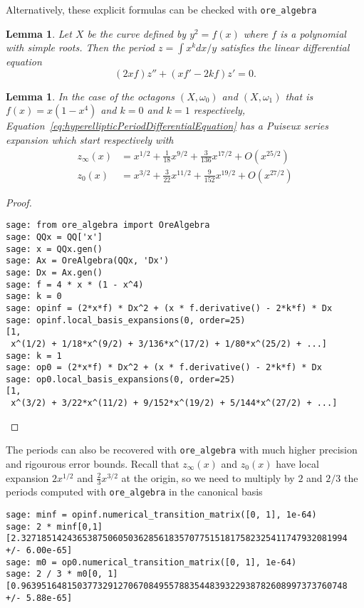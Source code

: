 \documentclass[a4paper,12pt]{article}
\newtheorem{lemma}[definition]{Lemma}
\begin{document}
Alternatively, these explicit formulas can be checked with \texttt{ore\_algebra}
\begin{lemma}
Let $X$ be the curve defined by $y^2 = f(x)$ where $f$ is a polynomial with simple roots.
Then the period $z = \int x^k dx / y$ satisfies the linear differential equation
\begin{equation}
\label{eq:hyperellipticPeriodDifferentialEquation}
(2xf) z'' + (x f' - 2kf) z' = 0.
\end{equation}
\end{lemma}

\begin{lemma}
In the case of the octagons $(X, \omega_0)$ and $(X, \omega_1)$ that is $f(x) = x (1-x^4)$
and $k=0$ and $k=1$ respectively, Equation~\eqref{eq:hyperellipticPeriodDifferentialEquation}
has a Puiseux series expansion which start respectively with
\begin{align*}
 z_\infty(x) &= x^{1/2} + \frac{1}{18} x^{9/2} + \frac{3}{136} x^{17/2} + O(x^{25/2}) \\
 z_0(x) &= x^{3/2} + \frac{3}{22} x^{11/2} + \frac{9}{152} x^{19/2} + O(x^{27/2})
\end{align*}
\end{lemma}
\begin{proof}
\begin{verbatim}
sage: from ore_algebra import OreAlgebra
sage: QQx = QQ['x']
sage: x = QQx.gen()
sage: Ax = OreAlgebra(QQx, 'Dx')
sage: Dx = Ax.gen()
sage: f = 4 * x * (1 - x^4)
sage: k = 0
sage: opinf = (2*x*f) * Dx^2 + (x * f.derivative() - 2*k*f) * Dx
sage: opinf.local_basis_expansions(0, order=25)
[1,
 x^(1/2) + 1/18*x^(9/2) + 3/136*x^(17/2) + 1/80*x^(25/2) + ...]
sage: k = 1
sage: op0 = (2*x*f) * Dx^2 + (x * f.derivative() - 2*k*f) * Dx
sage: op0.local_basis_expansions(0, order=25)
[1,
 x^(3/2) + 3/22*x^(11/2) + 9/152*x^(19/2) + 5/144*x^(27/2) + ...]
\end{verbatim}
\end{proof}
The periods can also be recovered with \texttt{ore\_algebra} with much higher
precision and rigourous error bounds. Recall that $z_\infty(x)$ and $z_0(x)$ have
local expansion $2 x^{1/2}$ and $\frac{2}{3} x^{3/2}$ at the origin, so we need
to multiply by $2$ and $2/3$ the periods computed with \texttt{ore\_algebra} in
the canonical basis
\begin{verbatim}
sage: minf = opinf.numerical_transition_matrix([0, 1], 1e-64)
sage: 2 * minf[0,1]
[2.3271851424365387506050362856183570775151817582325411747932081994 +/- 6.00e-65]
sage: m0 = op0.numerical_transition_matrix([0, 1], 1e-64)
sage: 2 / 3 * m0[0, 1]
[0.9639516481503773291270670849557883544839322938782608997373760748 +/- 5.88e-65]
\end{verbatim}
\end{document}

